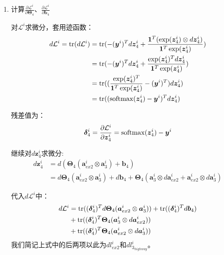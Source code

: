 \documentclass[12pt, a4paper]{article}
\newcommand{\imat}{\bm}
\newcommand{\ivec}{\bm}
\newcommand{\tr}{{\rm tr}}
\newcommand{\softmax}{{\rm softmax}}
\newcommand{\loss}{\mathcal{L}}
\newcommand{\thetam}{\imat{\Theta}}
\newcommand{\deltav}{\ivec{\delta}}
\newcommand{\av}{\ivec{a}}
\newcommand{\bv}{\ivec{b}}
\newcommand{\yv}{\ivec{y}}
\newcommand{\zv}{\ivec{z}}
\begin{document}
        \begin{enumerate}

        \item 计算$\frac{\partial \loss^i}{\partial \thetam_4}$、$\frac{\partial \loss^i}{\partial \bv_4}$

            对$\loss^i$求微分，套用迹函数：
            \begin{align*}
            d \loss^i = \tr(d \loss^i)
            &= \tr(- (\yv^i)^{T} d \zv_4^i + \frac{\ivec{1}^T (\exp(\zv_4^i) \otimes d \zv_4^i)}{\ivec{1}^T \exp(\zv_4^i)}) \\
            &= \tr(- (\yv^i)^{T} d \zv_4^i + \frac{\exp(\zv_4^i)^T d \zv_4^i}{\ivec{1}^T \exp(\zv_4^i)}) \\
            &= \tr((\frac{\exp(\zv_4^i)^T}{\ivec{1}^T \exp(\zv_4^i)} - (\yv^i)^{T}) d \zv_4^i) \\
            &= \tr((\softmax(\zv_4^i) - \yv^i)^T d \zv_4^i)
            \end{align*}

            残差值为：
            \begin{equation}\begin{aligned}
            \deltav_4^i = \frac{\partial \loss^i}{\partial \zv_4^i} = \softmax(\zv_4^i) - \yv^i
            \end{aligned}\end{equation}

            继续对$d \zv_4^i$求微分:
            \begin{align*}
            d \zv_4^i
            &= d (\thetam_4 (\av_{ex2}^i \otimes \av_3^i) + \bv_4) \\
            &= d \thetam_4 (\av_{ex2}^i \otimes \av_3^i) + d \bv_4 + \thetam_4 (\av_3^i \otimes d \av_{ex2}^i + \av_{ex2}^i \otimes d \av_3^i)
            \end{align*}

            代入$d \loss^i$中：
            \begin{align*}
            d \loss^i &= \tr((\deltav_4^i)^T d \thetam_4 (\av_{ex2}^i \otimes \av_3^i)) + \tr((\deltav_4^i)^T d \bv_4) \\
                    &+ \tr((\deltav_4^i)^T \thetam_4 (\av_3^i \otimes d \av_{ex2}^i)) \\
                    &+ \tr((\deltav_4^i)^T \thetam_4 (\av_{ex2}^i \otimes d \av_3^i))
            \end{align*}
            我们简记上式中的后两项以此为$d l_{ex2}^i$和$d l_{3_{highway}}^i$。


\end{enumerate}
\end{document}
